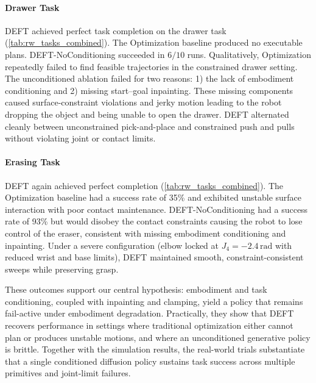 \paragraph{Drawer Task}
\textsc{DEFT} achieved perfect task completion on the drawer task (\cref{tab:rw_tasks_combined}). The Optimization baseline produced no executable plans. \textsc{DEFT}-NoConditioning succeeded in \(6/10\) runs. Qualitatively, Optimization repeatedly failed to find feasible trajectories in the constrained drawer setting. The unconditioned ablation failed for two reasons: 1) the lack of embodiment conditioning and 2) missing start--goal inpainting. These missing components caused surface-constraint violations and jerky motion leading to the robot dropping the object and being unable to open the drawer. \textsc{DEFT} alternated cleanly between unconstrained pick-and-place and constrained push and pulls without violating joint or contact limits.

\paragraph{Erasing Task}
\textsc{DEFT} again achieved perfect completion (\cref{tab:rw_tasks_combined}). The Optimization baseline had a success rate of 35\% and exhibited unstable surface interaction with poor contact maintenance. \textsc{DEFT}-NoConditioning had a success rate of 93\% but would disobey the contact constraints causing the robot to lose control of the eraser, consistent with missing embodiment conditioning and inpainting. Under a severe configuration (elbow locked at \(J_4=-2.4\,\mathrm{rad}\) with reduced wrist and base limits), \textsc{DEFT} maintained smooth, constraint-consistent sweeps while preserving grasp.

These outcomes support our central hypothesis: embodiment and task conditioning, coupled with inpainting and clamping, yield a policy that remains fail-active under embodiment degradation. 
Practically, they show that \textsc{DEFT} recovers performance in settings where traditional optimization either cannot plan or produces unstable motions, and where an unconditioned generative policy is brittle. 
Together with the simulation results, the real-world trials substantiate that a single conditioned diffusion policy sustains task success across multiple primitives and joint-limit failures. 


